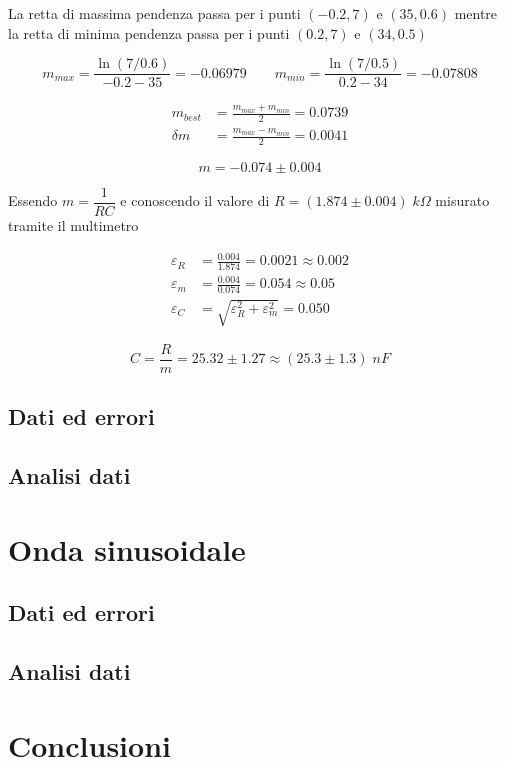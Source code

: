 \documentclass[11pt, letterpaper]{article}
\numberwithin{equation}{section} %
\begin{document}
La retta di massima pendenza passa per i punti \((-0.2, 7)\) e \((35, 0.6)\) mentre la retta di minima pendenza passa per i punti \((0.2, 7)\) e \((34, 0.5)\)

\begin{equation*}
    m_{max} = \frac{\ln(7/0.6)}{- 0.2 - 35} = - 0.06979
    \qquad
    m_{min} = \frac{\ln(7/0.5)}{0.2 - 34} = - 0.07808
\end{equation*}

\begin{align*}
    m_{best} &= \frac{m_{max} + m_{min}}{2} = 0.0739 \\
    \delta m &= \frac{m_{max} - m_{min}}{2} = 0.0041
\end{align*}

\begin{equation}
    m = - 0.074 \pm 0.004
\end{equation}

Essendo \(m = \dfrac{1}{RC}\) e conoscendo il valore di \(R = (1.874 \pm 0.004) \; \unit{k\Omega}\) misurato tramite il multimetro

\begin{align*}
    \varepsilon_R &= \frac{0.004}{1.874} = 0.0021 \approx 0.002 \\
    \varepsilon_m &= \frac{0.004}{0.074} = 0.054 \approx 0.05 \\
    \varepsilon_C &= \sqrt{\varepsilon_R^{2} + \varepsilon_m^{2}} = 0.050 %
\end{align*}

\begin{equation}
    C = \frac{R}{m} = 25.32 \pm 1.27 \approx (25.3 \pm 1.3) \; \unit{nF}
\end{equation}

\subsection{Dati ed errori}

\subsection{Analisi dati}

\section{Onda sinusoidale}

\subsection{Dati ed errori}

\subsection{Analisi dati}

\section{Conclusioni}
\end{document}

